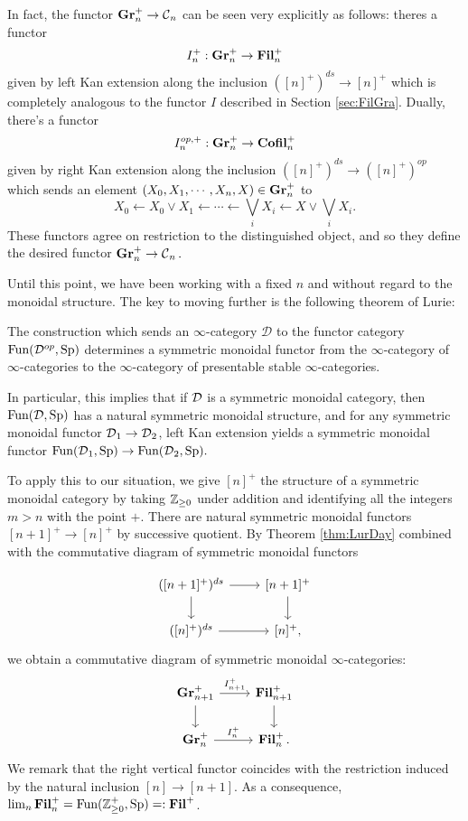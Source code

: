 In fact, the functor $\operatorname{\textbf{Gr}}_n^+ \to \operatorname{\mathcal{C}}_n$ can be seen very explicitly as follows: theres a functor $$I_n^+: \operatorname{\textbf{Gr}}_n^+ \to \operatorname{\textbf{Fil}}_n^+$$ given by left Kan extension along the inclusion $([n]^+)^{ds} \to [n]^+$ which is completely analogous to the functor $I$ described in Section \ref{sec:FilGra}.  Dually, there's a functor $$I_n^{op,+}:\operatorname{\textbf{Gr}}_n^+ \to \operatorname{\textbf{Cofil}}_n^+$$ given by right Kan extension along the inclusion $([n]^+)^{ds} \to ([n]^+)^{op}$ which sends an element $(X_0, X_1, \cdots, X_n, X)\in \operatorname{\textbf{Gr}}_n^+$ to $$X_0 \longleftarrow X_0\vee X_1 \longleftarrow \cdots \longleftarrow \bigvee_i X_i \longleftarrow X \vee \bigvee_i X_i.$$  These functors agree on restriction to the distinguished object, and so they define the desired functor $\operatorname{\textbf{Gr}}_n^+ \to \operatorname{\mathcal{C}}_n.$  





Until this point, we have been working with a fixed $n$ and without regard to the monoidal structure.  The key to moving further is the following theorem of Lurie:

\begin{thm}\label{thm:LurDay}%
The construction which sends an $\infty$-category $\mathcal{D}$ to the functor category $\operatorname{\text{Fun}}(\mathcal{D}^{op}, \operatorname{\text{Sp}})$ determines a symmetric monoidal functor from the $\infty$-category of $\infty$-categories to the $\infty$-category of presentable stable $\infty$-categories.  
\end{thm}

In particular, this implies that if $\operatorname{\mathcal{D}}$ is a symmetric monoidal category, then $\operatorname{\text{Fun}}(\operatorname{\mathcal{D}}, \operatorname{\text{Sp}})$ has a natural symmetric monoidal structure, and for any symmetric monoidal functor $\operatorname{\mathcal{D}}_1\to \operatorname{\mathcal{D}}_2$, left Kan extension yields a symmetric monoidal functor $\operatorname{\text{Fun}}(\operatorname{\mathcal{D}}_1,\operatorname{\text{Sp}}) \to \operatorname{\text{Fun}}(\operatorname{\mathcal{D}}_2,\operatorname{\text{Sp}}).$  

To apply this to our situation, we give $[n]^+$ the structure of a symmetric monoidal category by taking $\operatorname{\mathbb{Z}}_{\geq 0}$ under addition and identifying all the integers $m >n$ with the point $+$.  There are natural symmetric monoidal functors $[n+1]^+ \to [n]^+$ by successive quotient.  By Theorem \ref{thm:LurDay} combined with the commutative diagram of symmetric monoidal functors

$$
\begin{tikzcd}
(\lbrack n+1\rbrack^+)^{ds} \arrow[r] \arrow[d] & \lbrack n+1\rbrack^+ \arrow[d]\\
(\lbrack n\rbrack^+)^{ds} \arrow[r] & \lbrack n\rbrack^+ ,
\end{tikzcd}
$$
we obtain a commutative diagram of symmetric monoidal $\infty$-categories:
$$
\begin{tikzcd}
\Gr_{n+1}^+ \arrow[r,"I_{n+1}^+"] \arrow[d] & \Fil_{n+1}^+ \arrow[d]\\
\Gr_n^+  \arrow[r,"I_n^+"] & \Fil_n^+ .
\end{tikzcd}
$$
We remark that the right vertical functor coincides with the restriction induced by the natural inclusion $[n] \to [n+1]$.  As a consequence, $\lim_n \operatorname{\textbf{Fil}}_n^+ = \operatorname{\text{Fun}}(\operatorname{\mathbb{Z}}_{\geq 0}^+, \operatorname{\text{Sp}}) =: \operatorname{\textbf{Fil}}^+$.  

